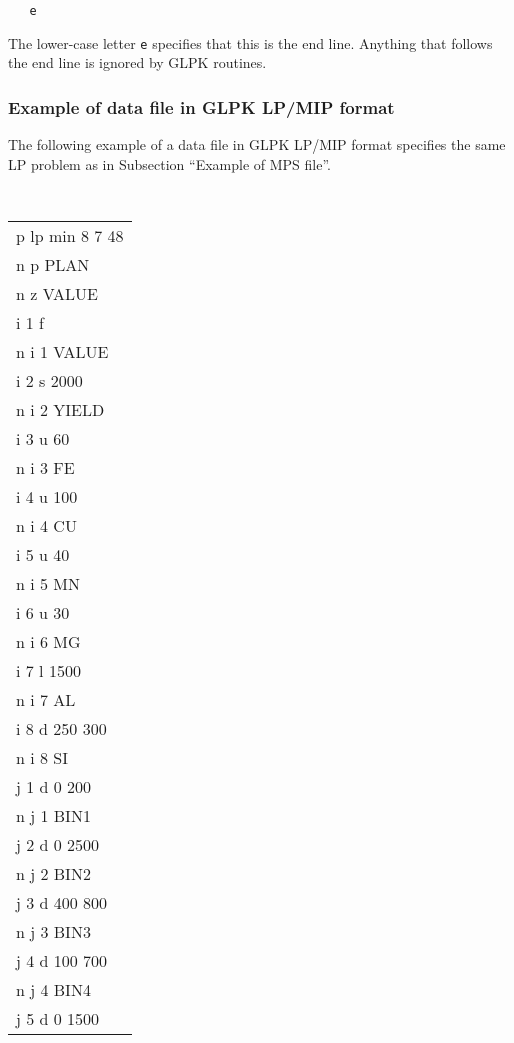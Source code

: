 \begin{verbatim}
   e
\end{verbatim}

The lower-case letter \verb|e| specifies that this is the end line.
Anything that follows the end line is ignored by GLPK routines.

\subsubsection*{Example of data file in GLPK LP/MIP format}

The following example of a data file in GLPK LP/MIP format specifies
the same LP problem as in Subsection ``Example of MPS file''.

\begin{center}
\footnotesize\tt
\begin{tabular}{l@{\hspace*{50pt}}}
p lp min 8 7 48   \\
n p PLAN          \\
n z VALUE         \\
i 1 f             \\
n i 1 VALUE       \\
i 2 s 2000        \\
n i 2 YIELD       \\
i 3 u 60          \\
n i 3 FE          \\
i 4 u 100         \\
n i 4 CU          \\
i 5 u 40          \\
n i 5 MN          \\
i 6 u 30          \\
n i 6 MG          \\
i 7 l 1500        \\
n i 7 AL          \\
i 8 d 250 300     \\
n i 8 SI          \\
j 1 d 0 200       \\
n j 1 BIN1        \\
j 2 d 0 2500      \\
n j 2 BIN2        \\
j 3 d 400 800     \\
n j 3 BIN3        \\
j 4 d 100 700     \\
n j 4 BIN4        \\
j 5 d 0 1500      \\

\end{tabular}
\end{center}
